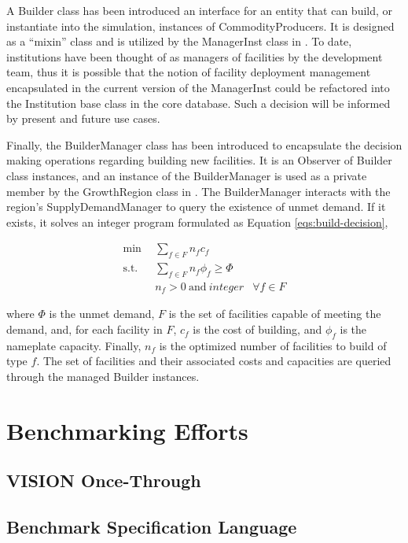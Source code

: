 A Builder class has been introduced an interface for an entity that can build,
or instantiate into the simulation, instances of CommodityProducers. It is
designed as a ``mixin'' class and is utilized by the ManagerInst class in
\Cycamore. To date, institutions have been thought of as managers of facilities
by the \Cyclus development team, thus it is possible that the notion of facility
deployment management encapsulated in the current version of the ManagerInst
could be refactored into the Institution base class in the \Cyclus core
database. Such a decision will be informed by present and future use cases.

Finally, the BuilderManager class has been introduced to encapsulate the
decision making operations regarding building new facilities. It is an Observer
of Builder class instances, and an instance of the BuilderManager is used as a
private member by the GrowthRegion class in \Cycamore. The BuilderManager
interacts with the region's SupplyDemandManager to query the existence of unmet
demand. If it exists, it solves an integer program formulated as Equation
\ref{eqs:build-decision},

\begin{subequations}\label{eqs:build-decision}
  \begin{align}
    \min \:\: & 
    \sum_{f \in F} n_f c_f
    & \\
    \text{s.t.} \:\: &
    \sum_{f \in F} n_f \phi_f \ge \Phi
    & \\
    &
    n_f > 0 \: \text{and} \: integer
    &
    \forall f \in F
  \end{align}
\end{subequations}
  
where $\Phi$ is the unmet demand, $F$ is the set of facilities capable of
meeting the demand, and, for each facility in $F$, $c_f$ is the cost of
building, and $\phi_f$ is the nameplate capacity.  Finally, $n_f$ is the
optimized number of facilities to build of type $f$. The set of facilities and
their associated costs and capacities are queried through the managed Builder
instances.


\subsection{\Cyclopts}

\section{Benchmarking Efforts}\label{sec:prev-benchmark}

\subsection{VISION Once-Through}

\subsection{Benchmark Specification Language}
